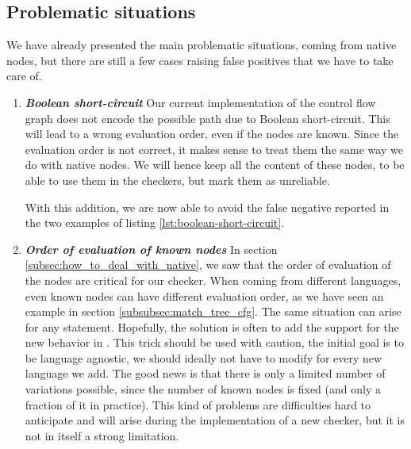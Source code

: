 \subsection{Problematic situations}
\label{subsec:other_problematic_situation}
	
We have already presented the main problematic situations, coming from native nodes, but there are still a few cases raising false positives that we have to take care of.

\begin{enumerate}
	\item \textbf{\textit{Boolean short-circuit}} \newline 
	\label{subsubsec:boolean_short_circuit}
	Our current implementation of the control flow graph does not encode the possible path due to Boolean short-circuit. 
	This will lead to a wrong evaluation order, even if the nodes are known. 
	Since the evaluation order is not correct, it makes sense to treat them the same way we do with native nodes.
	We will hence keep all the content of these nodes, to be able to use them in the checkers, but mark them as unreliable. 


	
	With this addition, we are now able to avoid the false negative reported in the two examples of listing \ref{lst:boolean-short-circuit}.
	\pagebreak
	\item \textbf{\textit{Order of evaluation of known nodes}} \newline 
	\label{subsubsec:evaluation_known_nodes}
	In section \ref{subsec:how_to_deal_with_native}, we saw that the order of evaluation of the nodes are critical for our checker.
	When coming from different languages, even known nodes can have different evaluation order, as we have seen an example in section \ref{subsubsec:match_tree_cfg}. 
	The same situation can arise for any statement.
	Hopefully, the solution is often to add the support for the new behavior in \slang{}.
	This trick should be used with caution, the initial goal is to be language agnostic, we should ideally not have to modify \slang{} for every new language we add. 
	The good news is that there is only a limited number of variations possible, since the number of known nodes is fixed (and only a fraction of it in practice). 
	This kind of problems are difficulties hard to anticipate and will arise during the implementation of a new checker, but it is not in itself a strong limitation.
	

\end{enumerate}
